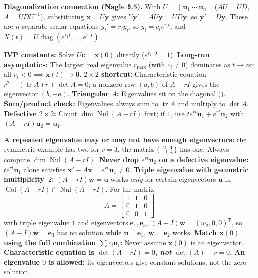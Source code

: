 \documentclass[10pt]{scrartcl}
\newcommand{\vv}[1]{\mathbf{#1}}
\DeclareMathOperator{\Col}{Col}
\DeclareMathOperator{\Nul}{Nul}
\DeclareMathOperator{\tr}{tr}
\begin{document}
\medskip\noindent\textbf{Diagonalization connection (Nagle 9.5).} With $U=[\,\vv u_1\ \cdots\ \vv u_n\,]$ ($AU=UD$, $A=UDU^{-1}$), substituting $\vv x=U\vv y$ gives $U\vv y'=AU\vv y=UD\vv y$, so $\vv y'=D\vv y$. These are $n$ separate scalar equations $y_i'=r_i y_i$, so $y_i=c_ie^{r_it}$, and $X(t)=U\operatorname{diag}(e^{r_1t},\dots,e^{r_nt})$.

\begin{shortcuts}
  \ii \textbf{IVP constants:} Solve $U\vv c=\vv x(0)$ directly ($e^{r_i\cdot 0}=1$).
  \ii \textbf{Long-run asymptotics:} The largest real eigenvalue $r_{\max}$ (with $c_i\neq 0$) dominates as $t\to\infty$; all $r_i<0\implies \vv x(t)\to\vv 0$.
  \ii \textbf{$2\times 2$ shortcut:} Characteristic equation $r^2-(\tr A)r+\det A=0$; a nonzero row $(a,b)$ of $A-rI$ gives the eigenvector $(b,-a)$.
  \ii \textbf{Triangular $A$:} Eigenvalues sit on the diagonal ().
  \ii \textbf{Sum/product check:} Eigenvalues always sum to $\tr A$ and multiply to $\det A$.
  \ii \textbf{Defective $2\times 2$:} Count $\dim\Nul(A-rI)$ first; if $1$, use $te^{rt}\vv u_1+e^{rt}\vv u_2$ with $(A-rI)\vv u_2=\vv u_1$.
\end{shortcuts}

\begin{trapbox}
  \ii \textbf{A repeated eigenvalue may or may not have enough eigenvectors:} the symmetric example has two for $r=3$, the matrix $\begin{psmallmatrix}2&1\\-1&4\end{psmallmatrix}$ has one. Always compute $\dim\Nul(A-rI)$.
  \ii \textbf{Never drop $e^{rt}\vv u_2$ on a defective eigenvalue:} $te^{rt}\vv u_1$ alone satisfies $\vv x'-A\vv x=e^{rt}\vv u_1\neq\vv 0$.
  \ii \textbf{Triple eigenvalue with geometric multiplicity~$2$:} $(A-rI)\vv w=\vv u$ works \emph{only} for certain eigenvectors $\vv u$ in $\Col(A-rI)\cap\Nul(A-rI)$. For the matrix
  \[
    A=\begin{bmatrix}1&1&0\\0&1&0\\0&0&1\end{bmatrix}
  \]
  with triple eigenvalue $1$ and eigenvectors $\vv e_1,\vv e_3$, $(A-I)\vv w=(w_2,0,0)^{\mathsf T}$, so $(A-I)\vv w=\vv e_3$ has no solution while $\vv u=\vv e_1,\ \vv w=\vv e_2$ works.
  \ii \textbf{Match $\vv x(0)$ using the full combination $\sum c_i\vv u_i$:} Never assume $\vv x(0)$ is an eigenvector.
  \ii \textbf{Characteristic equation is $\det(A-rI)=0$, \emph{not} $\det(A)-r=0$.}
  \ii \textbf{An eigenvalue $0$ is allowed:} its eigenvectors give constant solutions, not the zero solution.
\end{trapbox}
\end{document}
